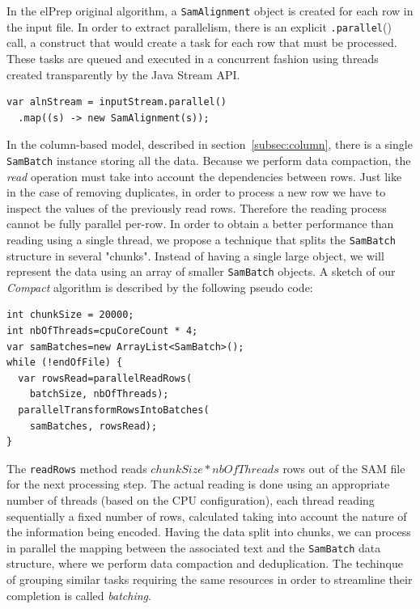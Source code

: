 \documentclass[a4paper,twoside]{article}
\begin{document}
In the elPrep original algorithm, a {\texttt{SamAlignment}} object is created for each row in the input file.
In order to extract parallelism, there is an explicit {\texttt{.parallel}()} call, a construct that would create a task for each row that must be processed.
These tasks are queued and executed in a concurrent fashion using threads created transparently by the Java Stream API.
\begin{verbatim}
var alnStream = inputStream.parallel()
  .map((s) -> new SamAlignment(s));
\end{verbatim}
In the column-based model, described in section~\ref{subsec:column}, there is a single {\texttt{SamBatch}} instance storing all the data.
Because we perform data compaction, the {\textit{read}} operation must take into account the dependencies between rows.
Just like in the case of removing duplicates, in order to process a new row we have to inspect the values of the previously read rows.
Therefore the reading process cannot be fully parallel per-row.
In order to obtain a better performance than reading using a single thread, we propose a technique that splits the {\texttt{SamBatch}} structure in several "chunks".
Instead of having a single large object, we will represent the data using an array of smaller {\texttt{SamBatch}} objects.
A sketch of our {\textit{Compact}} algorithm is described by the following pseudo code:

\begin{verbatim}
int chunkSize = 20000;
int nbOfThreads=cpuCoreCount * 4;
var samBatches=new ArrayList<SamBatch>();
while (!endOfFile) {
  var rowsRead=parallelReadRows(
    batchSize, nbOfThreads);
  parallelTransformRowsIntoBatches(
    samBatches, rowsRead);
}
\end{verbatim}

The {\texttt{readRows}} method reads $chunkSize * nbOfThreads$ rows out of the SAM file for the next processing step.
The actual reading is done using an appropriate number of threads (based on the CPU configuration), each thread reading sequentially a fixed number of rows, calculated taking into account the nature of the information being encoded.
Having the data split into chunks, we can process in parallel the mapping between the associated text and the {\texttt{SamBatch}} data structure, where we perform data compaction and deduplication.
The techinque of grouping similar tasks requiring the same resources in order to streamline their completion is called {\textit{batching}}.
\end{document}
